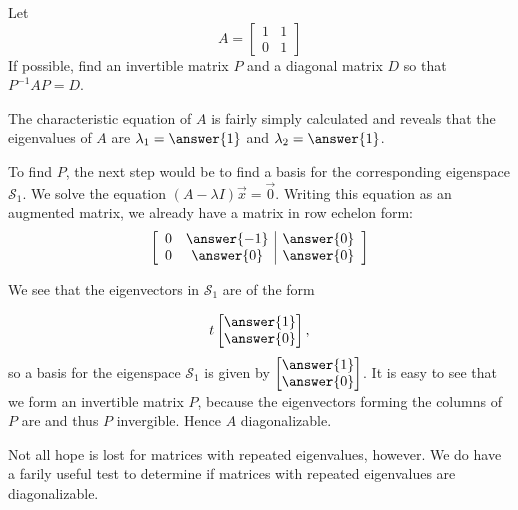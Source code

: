 \documentclass{ximera}
\begin{document}
  \begin{example}\label{ex:impossiblediagonalize}
  Let
  \begin{equation*}
  A =
  \begin{bmatrix}
  1 & 1 \\
  0 & 1
  \end{bmatrix}
  \end{equation*}
  If possible, find an invertible matrix $P$ and a diagonal matrix $D$ so that $P^{-1}AP=D$.

  The characteristic equation of $A$ is fairly simply calculated and reveals that the eigenvalues of $A$ are $\lambda_1 =\answer{1}$ and  $\lambda_2=\answer{1}$.
  
  
  To find $P$, the next step would be to find a basis for the corresponding eigenspace $\mathcal{S}_1$.  We solve the equation $\left( A - \lambda I \right) \vec{x} = \vec{0}$.
  Writing this equation as an augmented matrix, we already have a matrix in row echelon form:
  \begin{equation*}
  \left[\begin{array}{cc|c} 
  0 & \answer{-1} & \answer{0} \\
  0 & \answer{0} & \answer{0}
   \end{array}\right]
  \end{equation*}

  We see that the eigenvectors in $\mathcal{S}_1$ are of the form

  $$
  t\begin{bmatrix}
  \answer{1} \\
  \answer{0}
  \end{bmatrix},
  $$
  so a basis for the eigenspace $\mathcal{S}_1$ is given by
  $\begin{bmatrix}
  \answer{1} \\
  \answer{0}
  \end{bmatrix}$.
  It is easy to see that we  form an invertible matrix $P$, because the eigenvectors forming the columns of $P$ are  and thus $P$  invergible. Hence $A$  diagonalizable.

  \end{example}
  
  Not all hope is lost for matrices with repeated eigenvalues, however. We do have a farily useful test to determine if matrices with repeated eigenvalues are diagonalizable.
   
\end{document}
